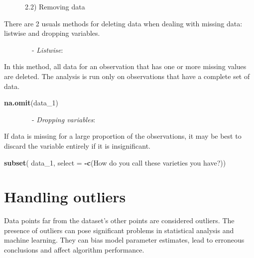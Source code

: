 \documentclass[
]{book}
\newenvironment{Shaded}{\begin{snugshade}}{\end{snugshade}}
\newcommand{\AttributeTok}[1]{\textcolor[rgb]{0.13,0.29,0.53}{#1}}
\newcommand{\CommentTok}[1]{\textcolor[rgb]{0.56,0.35,0.01}{\textit{#1}}}
\newcommand{\FloatTok}[1]{\textcolor[rgb]{0.00,0.00,0.81}{#1}}
\newcommand{\FunctionTok}[1]{\textcolor[rgb]{0.13,0.29,0.53}{\textbf{#1}}}
\newcommand{\NormalTok}[1]{#1}
\newcommand{\OtherTok}[1]{\textcolor[rgb]{0.56,0.35,0.01}{#1}}
\newcommand{\SpecialCharTok}[1]{\textcolor[rgb]{0.81,0.36,0.00}{\textbf{#1}}}
\newcommand{\StringTok}[1]{\textcolor[rgb]{0.31,0.60,0.02}{#1}}
\begin{document}
~~~~~~2.2) Removing data

There are 2 usuals methods for deleting data when dealing with missing data: listwise and dropping variables.

~~~~~~~~- \emph{Listwise}:

In this method, all data for an observation that has one or more missing values are deleted. The analysis is run only on observations that have a complete set of data.

\begin{Shaded}
\begin{Highlighting}[]
\FunctionTok{na.omit}\NormalTok{(data\_1)}
\end{Highlighting}
\end{Shaded}

~~~~~~~~- \emph{Dropping variables}:

If data is missing for a large proportion of the observations, it may be best to discard the variable entirely if it is insignificant.

\begin{Shaded}
\begin{Highlighting}[]
\FunctionTok{subset}\NormalTok{( data\_1, }\AttributeTok{select =} \SpecialCharTok{{-}}\FunctionTok{c}\NormalTok{(}\StringTok{\textasciigrave{}}\AttributeTok{How do you call these varieties you have?}\StringTok{\textasciigrave{}}\NormalTok{))}
\end{Highlighting}
\end{Shaded}

\hypertarget{handling-outliers}{%
\section{Handling outliers}\label{handling-outliers}}

Data points far from the dataset's other points are considered outliers. The presence of outliers can pose significant problems in statistical analysis and machine learning. They can bias model parameter estimates, lead to erroneous conclusions and affect algorithm performance.

\begin{Shaded}
\end{Shaded}
\end{document}
